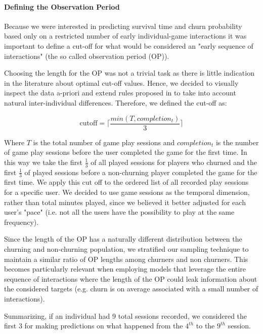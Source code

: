 

\paragraph*{Defining the Observation Period}
Because we were interested in predicting survival time and churn probability based only on a restricted number of early individual-game interactions it was important to define a cut-off for what would be considered an "early sequence of interactions" (the so called observation period (OP)). 

Choosing the length for the OP was not a trivial task as there is little indication in the literature about optimal cut-off values. Hence, we decided to visually inspect the data a-priori and extend rules proposed in \cite{drachen2016rapid, milovsevic2017early} to take into account natural inter-individual differences. Therefore, we defined the cut-off as:

\begin{equation}
\label{cutoffop}
    \text{cutoff} = 
    \Biggl\lceil
        \dfrac
            {min(T, completion_t)}
            {3}
    \Biggr\rceil
\end{equation}

Where $T$ is the total number of game play sessions and $completion_t$ is the number of game play sessions before the user completed the game for the first time. In this way we take the first $\frac{1}{3}$ of all played sessions for players who churned and the first $\frac{1}{3}$ of played sessions before a non-churning player completed the game for the first time. We apply this cut off to the ordered list of all recorded play sessions for a specific user. We decided to use game sessions as the temporal dimension, rather than total minutes played, since we believed it better adjusted for each user's "pace" (i.e. not all the users have the possibility to play at the same frequency). 

Since the length of the OP has a naturally different distribution between the churning and non-churning population, we stratified our sampling technique to maintain a similar ratio of OP lengths among churners and non churners. This becomes particularly relevant when employing models that leverage the entire sequence of interactions where the length of the OP could leak information about the considered targets (e.g. churn is on average associated with a small number of interactions). 

Summarizing, if an individual had 9 total sessions recorded, we considered the first 3 for making predictions on what happened from the $4^{th}$ to the $9^{th}$ session. 

